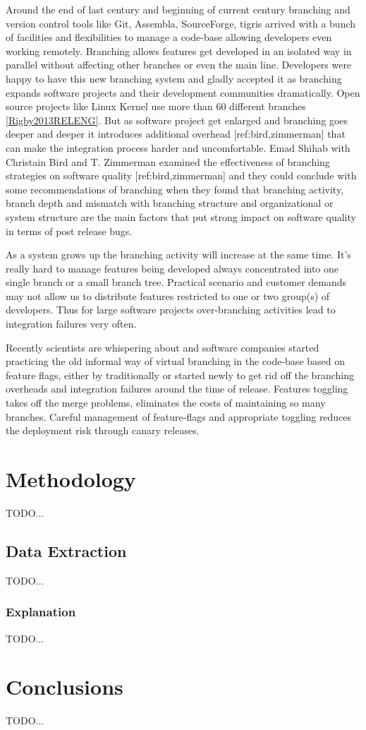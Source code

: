 \documentclass{acm_proc_article-sp}
\begin{document}
Around the end of last century and beginning of current century branching and version control tools like Git, Assembla, SourceForge, tigris arrived with a bunch of facilities and flexibilities to manage a code-base allowing developers even working remotely. Branching allows features get developed in an isolated way in parallel without affecting other branches or even the main line. Developers were happy to have this new branching system and gladly accepted it as branching expands software projects and their development communities dramatically. Open source projects like Linux Kernel use more than 60 different branches \ref{Rigby2013RELENG}. But as software project get enlarged and branching goes deeper and deeper it introduces additional overhead [ref:bird,zimmerman] that can make the integration process harder and uncomfortable. Emad Shihab with Christain Bird and T. Zimmerman examined the effectiveness of branching strategies on software quality [ref:bird,zimmerman] and they could conclude with some recommendations of branching when they found that branching activity, branch depth and mismatch with branching structure and organizational or system structure are the main factors that put strong impact on software quality in terms of post release bugs.

As a system grows up the branching activity will increase at the same time. It's really hard to manage features being developed always concentrated into one single branch or a small branch tree. Practical scenario and customer demands may not allow us to distribute features restricted to one or two group(s) of developers. Thus for large software projects over-branching activities lead to integration failures very often.

Recently scientists are whispering about and software companies started practicing the old informal way of virtual branching in the code-base based on feature flags, either by traditionally or started newly to get rid off the branching overheads and integration failures around the time of release. Features toggling takes off the merge problems, eliminates the costs of maintaining so many branches. Careful management of feature-flags and appropriate toggling reduces the deployment risk through canary releases.

\section{Methodology}
TODO...

\subsection{Data Extraction}
TODO...

\subsubsection{Explanation}
TODO...

\section{Conclusions}
TODO...




\balancecolumns
\end{document}
